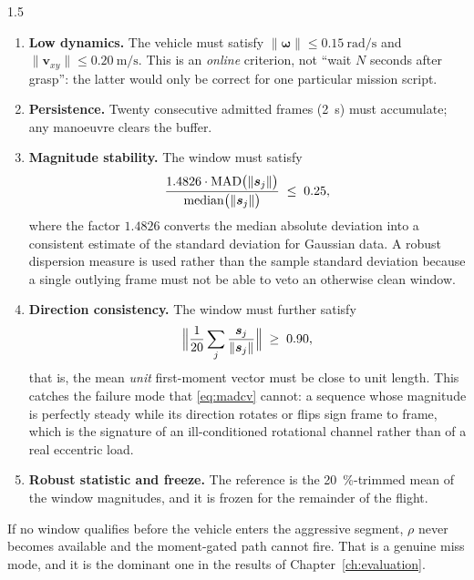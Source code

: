 \begin{spacing}{1.5}
\begin{enumerate}
\item \textbf{Low dynamics.} The vehicle must satisfy
$\lVert\bm\omega\rVert\le\SI{0.15}{\radian\per\second}$ and
$\lVert\bm v_{xy}\rVert\le\SI{0.20}{\meter\per\second}$. This is an
\emph{online} criterion, not ``wait $N$ seconds after grasp'': the latter would
only be correct for one particular mission script.

\item \textbf{Persistence.} Twenty consecutive admitted frames
(\SI{2}{\second}) must accumulate; any manoeuvre clears the buffer.

\item \textbf{Magnitude stability.} The window must satisfy
\begin{equation}
\frac{1.4826\cdot\mathrm{MAD}\bigl(\lVert\bm{s}_j\rVert\bigr)}
     {\mathrm{median}\bigl(\lVert\bm{s}_j\rVert\bigr)} \;\le\; 0.25,
\label{eq:madcv}
\end{equation}
where the factor $1.4826$ converts the median absolute deviation into a
consistent estimate of the standard deviation for Gaussian data. A robust
dispersion measure is used rather than the sample standard deviation because a
single outlying frame must not be able to veto an otherwise clean window.

\item \textbf{Direction consistency.} The window must further satisfy
\begin{equation}
\Bigl\lVert \frac{1}{20}\sum_{j} \frac{\bm{s}_j}{\lVert\bm{s}_j\rVert} \Bigr\rVert \;\ge\; 0.90 ,
\label{eq:dirmean}
\end{equation}
that is, the mean \emph{unit} first-moment vector must be close to unit length.
This catches the failure mode that \eqref{eq:madcv} cannot: a sequence whose
magnitude is perfectly steady while its direction rotates or flips sign frame to
frame, which is the signature of an ill-conditioned rotational channel rather
than of a real eccentric load.

\item \textbf{Robust statistic and freeze.} The reference is the
\SI{20}{\percent}-trimmed mean of the window magnitudes, and it is frozen for the
remainder of the flight.
\end{enumerate}

If no window qualifies before the vehicle enters the aggressive segment, $\rho$
never becomes available and the moment-gated path cannot fire. That is a genuine
miss mode, and it is the dominant one in the results of
Chapter~\ref{ch:evaluation}.


\end{spacing}
